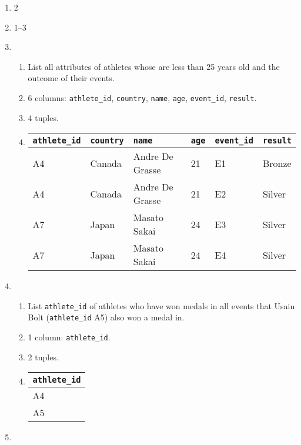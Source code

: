 \documentclass{homework}
\begin{document}
\begin{enumerate}
    \item 2
    \item 1--3
    \item
    \begin{enumerate}
        \item List all attributes of athletes whose are less than 25 years old and the outcome of their events.
        \item 6 columns: \texttt{athlete\_id}, \texttt{country}, \texttt{name}, \texttt{age}, \texttt{event\_id}, \texttt{result}.
        \item 4 tuples.
        \item
        \begin{tabular}{@{}llllll@{}}
            \toprule
            \texttt{athlete\_id} & \texttt{country} & \texttt{name}            & \texttt{age} & \texttt{event\_id} & \texttt{result} \\ \midrule
            A4          & Canada  & Andre De Grasse & 21  & E1        & Bronze \\
            A4          & Canada  & Andre De Grasse & 21  & E2        & Silver \\
            A7          & Japan   & Masato Sakai    & 24  & E3        & Silver \\
            A7          & Japan   & Masato Sakai    & 24  & E4        & Silver \\ \bottomrule
        \end{tabular}
    \end{enumerate}
    \item
    \begin{enumerate}
        \item List \texttt{athlete\_id} of athletes who have won medals in all events that Usain Bolt (\texttt{athlete\_id} A5) also won a medal in.
        \item 1 column: \texttt{athlete\_id}.
        \item 2 tuples.
        \item 
        \begin{tabular}{@{}l@{}}
            \toprule
            \texttt{athlete\_id} \\ \midrule
            A4          \\
            A5          \\ \bottomrule
        \end{tabular}
    \end{enumerate}
    \item

\end{enumerate}
\end{document}
